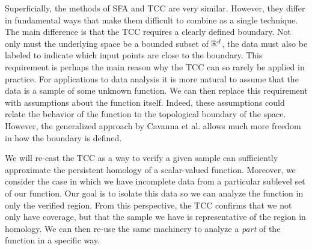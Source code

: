 Superficially, the methods of SFA and TCC are very similar.
However, they differ in fundamental ways that make them difficult to combine as a single technique.
The main difference is that the TCC requires a clearly defined boundary.
Not only must the underlying space be a bounded subset of $\mathbb{R}^d$, the data must also be labeled to indicate which input points are close to the boundary.
This requirement is perhaps the main reason why the TCC can so rarely be applied in practice.
For applications to data analysis it is more natural to assume that the data is a sample of some unknown function.
We can then replace this requirement with assumptions about the function itself.
Indeed, these assumptions could relate the behavior of the function to the topological boundary of the space.
However, the generalized approach by Cavanna et al. allows much more freedom in how the boundary is defined.

We will re-cast the TCC as a way to verify a given sample can sufficiently approximate the persistent homology of a scalar-valued function.
Moreover, we consider the case in which we have incomplete data from a particular sublevel set of our function.
Our goal is to isolate this data so we can analyze the function in only the verified region.
From this perspective, the TCC confirms that we not only have coverage, but that the sample we have is representative of the region in homology.
We can then re-use the same machinery to analyze a \emph{part} of the function in a specific way.



